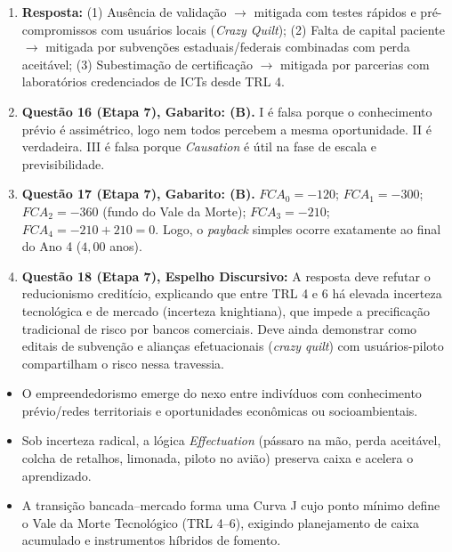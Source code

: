\begin{boxGabarito}
\begin{enumerate}[leftmargin=1.5em, itemsep=4pt]
    \item \textbf{Resposta:} (1) Ausência de validação $\to$ mitigada com testes rápidos e pré-compromissos com usuários locais (\textit{Crazy Quilt}); (2) Falta de capital paciente $\to$ mitigada por subvenções estaduais/federais combinadas com perda aceitável; (3) Subestimação de certificação $\to$ mitigada por parcerias com laboratórios credenciados de ICTs desde TRL 4.
    \item \textbf{Questão 16 (Etapa 7), Gabarito: (B).} I é falsa porque o conhecimento prévio é assimétrico, logo nem todos percebem a mesma oportunidade. II é verdadeira. III é falsa porque \textit{Causation} é útil na fase de escala e previsibilidade.
    \item \textbf{Questão 17 (Etapa 7), Gabarito: (B).} $FCA_0 = -120$; $FCA_1 = -300$; $FCA_2 = -360$ (fundo do Vale da Morte); $FCA_3 = -210$; $FCA_4 = -210 + 210 = 0$. Logo, o \textit{payback} simples ocorre exatamente ao final do Ano 4 ($4{,}00$ anos).
    \item \textbf{Questão 18 (Etapa 7), Espelho Discursivo:} A resposta deve refutar o reducionismo creditício, explicando que entre TRL 4 e 6 há elevada incerteza tecnológica e de mercado (incerteza knightiana), que impede a precificação tradicional de risco por bancos comerciais. Deve ainda demonstrar como editais de subvenção e alianças efetuacionais (\textit{crazy quilt}) com usuários-piloto compartilham o risco nessa travessia.
  \end{enumerate}
\end{boxGabarito}

\begin{boxResumo}
  \begin{itemize}[leftmargin=1.4em, itemsep=2pt]
    \item O empreendedorismo emerge do nexo entre indivíduos com conhecimento prévio/redes territoriais e oportunidades econômicas ou socioambientais.
    \item Sob incerteza radical, a lógica \textit{Effectuation} (pássaro na mão, perda aceitável, colcha de retalhos, limonada, piloto no avião) preserva caixa e acelera o aprendizado.
    \item A transição bancada–mercado forma uma Curva J cujo ponto mínimo define o Vale da Morte Tecnológico (TRL 4–6), exigindo planejamento de caixa acumulado e instrumentos híbridos de fomento.
  \end{itemize}
\end{boxResumo}

